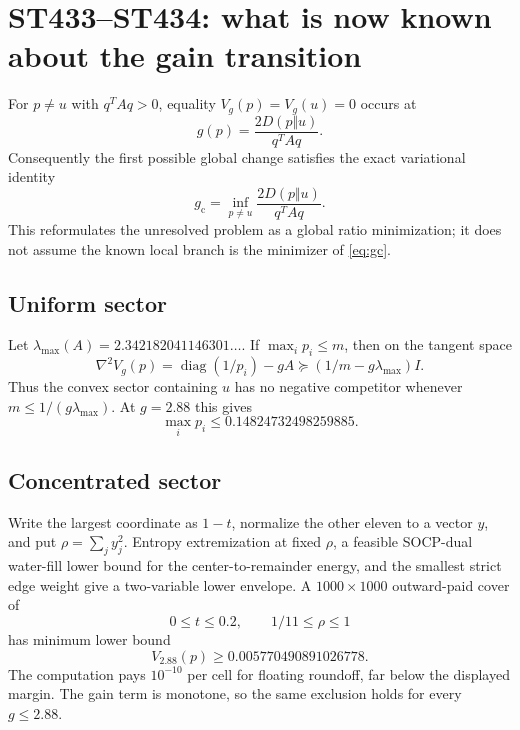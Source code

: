 \documentclass[11pt,a4paper]{article}
\begin{document}
\section{ST433--ST434: what is now known about the gain transition}

For $p\ne u$ with $q^TAq>0$, equality $V_g(p)=V_g(u)=0$ occurs at
\begin{equation}\label{eq:ratio}
 g(p)=\frac{2D(p\Vert u)}{q^TAq}.
\end{equation}
Consequently the first possible global change satisfies the exact variational
identity
\begin{equation}\label{eq:gc}
 g_{\mathrm c}=\inf_{p\ne u}\frac{2D(p\Vert u)}{q^TAq}.
\end{equation}
This reformulates the unresolved problem as a global ratio minimization; it
does not assume the known local branch is the minimizer of \eqref{eq:gc}.

\subsection{Uniform sector}

Let $\lambda_{\max}(A)=2.342182041146301\ldots$.  If
$\max_i p_i\le m$, then on the tangent space
\[
 \nabla^2V_g(p)=\operatorname{diag}(1/p_i)-gA
 \succeq(1/m-g\lambda_{\max})I.
\]
Thus the convex sector containing $u$ has no negative competitor whenever
$m\le1/(g\lambda_{\max})$.  At $g=2.88$ this gives
\begin{equation}\label{eq:mconv}
 \max_i p_i\le0.14824732498259885.
\end{equation}

\subsection{Concentrated sector}

Write the largest coordinate as $1-t$, normalize the other eleven to a vector
$y$, and put $\rho=\sum_jy_j^2$.  Entropy extremization at fixed $\rho$, a
feasible SOCP-dual water-fill lower bound for the center-to-remainder energy,
and the smallest strict edge weight give a two-variable lower envelope.
A $1000\times1000$ outward-paid cover of
\[
 0\le t\le0.2,\qquad 1/11\le\rho\le1
\]
has minimum lower bound
\begin{equation}\label{eq:margin}
 V_{2.88}(p)\ge0.005770490891026778.
\end{equation}
The computation pays $10^{-10}$ per cell for floating roundoff, far below the
displayed margin.  The gain term is monotone, so the same exclusion holds for
every $g\le2.88$.
\end{document}
